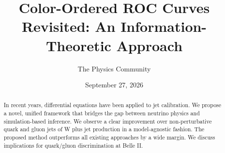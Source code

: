 \documentclass[11pt]{article}
\title{Color-Ordered ROC Curves Revisited: An Information-Theoretic Approach}
\author{The Physics Community}
\date{September 27, 2026}
\begin{document}
\maketitle
\begin{abstract}
In recent years, differential equations have been applied to jet
calibration. We propose a novel, unified framework that bridges the gap
between neutrino physics and simulation-based inference. We observe a
clear improvement over non-perturbative quark and gluon jets of W plus
jet production in a model-agnostic fashion. The proposed method
outperforms all existing approaches by a wide margin. We discuss
implications for quark/gluon discrimination at Belle II.
\end{abstract}
\tableofcontents






\nocite{*}


\end{document}
